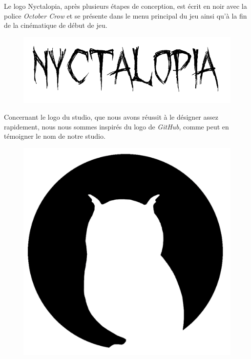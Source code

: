 Le logo Nyctalopia, après plusieurs étapes de conception, est écrit en noir avec la police \emph{October Crow} et se présente dans le menu principal du jeu ainsi qu'à la fin de la cinématique de début de jeu.

\begin{figure}[H]
\centering
\begin{minipage}{.5\textwidth}
  \centering
  \centerline{\includegraphics[width=1\linewidth]{img/font.png}}
  \label{fig:octobercrowfont}
\end{minipage}%
\end{figure}

Concernant le logo du studio, que nous avons réussit à le désigner assez rapidement, nous nous sommes inspirés du logo de \emph{GitHub}, comme peut en témoigner le nom de notre studio.


\begin{figure}[H]
\centering
\begin{minipage}{.5\textwidth}
  \centering
  \centerline{\includegraphics[width=1\linewidth]{img/logos/logo.png}}
  \label{fig:octobercrowfont}
\end{minipage}%
\end{figure}


